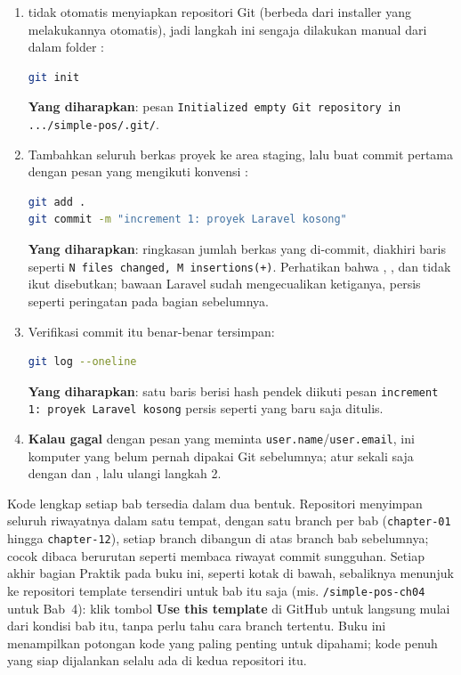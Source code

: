 \begin{enumerate}
  \item {} tidak otomatis menyiapkan repositori
    Git (berbeda dari installer  yang melakukannya
    otomatis), jadi langkah ini sengaja dilakukan manual dari dalam folder
    :
    \begin{lstlisting}[language=bash]
git init
    \end{lstlisting}
    \textbf{Yang diharapkan}: pesan \texttt{Initialized empty Git
    repository in .../simple-pos/.git/}.
  \item Tambahkan seluruh berkas proyek ke area staging, lalu buat commit
    pertama dengan pesan yang mengikuti konvensi :
    \begin{lstlisting}[language=bash]
git add .
git commit -m "increment 1: proyek Laravel kosong"
    \end{lstlisting}
    \textbf{Yang diharapkan}: ringkasan jumlah berkas yang di-commit,
    diakhiri baris seperti \texttt{N files changed, M insertions(+)}.
    Perhatikan bahwa , , dan
     tidak ikut disebutkan;  bawaan Laravel
    sudah mengecualikan ketiganya, persis seperti peringatan pada bagian
    sebelumnya.
  \item Verifikasi commit itu benar-benar tersimpan:
    \begin{lstlisting}[language=bash]
git log --oneline
    \end{lstlisting}
    \textbf{Yang diharapkan}: satu baris berisi hash pendek diikuti pesan
    \texttt{increment 1: proyek Laravel kosong} persis seperti yang baru
    saja ditulis.
  \item \textbf{Kalau  gagal} dengan pesan yang meminta
    \texttt{user.name}/\texttt{user.email}, ini komputer yang belum
    pernah dipakai Git sebelumnya; atur sekali saja dengan
     dan
    , lalu ulangi
    langkah 2.
\end{enumerate}

\begin{tipbox}
Kode lengkap setiap bab tersedia dalam dua bentuk. Repositori
\texttt{\repobase} menyimpan seluruh riwayatnya dalam satu tempat, dengan
satu branch per bab (\texttt{chapter-01} hingga \texttt{chapter-12}), setiap
branch dibangun di atas branch bab sebelumnya; cocok dibaca berurutan
seperti membaca riwayat commit sungguhan. Setiap akhir bagian Praktik pada
buku ini, seperti kotak di bawah, sebaliknya menunjuk ke repositori
template tersendiri untuk bab itu saja (mis. \texttt{\repoowner/simple-pos-ch04}
untuk Bab~4): klik tombol \textbf{Use this template} di GitHub untuk
langsung mulai dari kondisi bab itu, tanpa perlu tahu cara  branch tertentu. Buku ini menampilkan potongan kode yang paling
penting untuk dipahami; kode penuh yang siap dijalankan selalu ada di
kedua repositori itu.
\end{tipbox}

